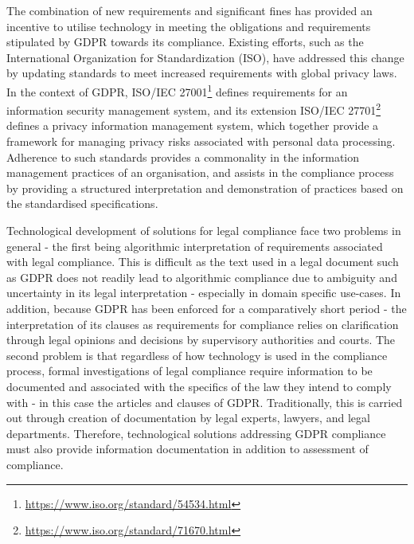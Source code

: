The combination of new requirements and significant fines has provided an incentive to utilise technology in meeting the obligations and requirements stipulated by GDPR towards its compliance.
Existing efforts, such as the International Organization for Standardization (ISO), have addressed this change by updating standards to meet increased requirements with global privacy laws.
In the context of GDPR, ISO/IEC 27001\footnote{\url{https://www.iso.org/standard/54534.html}} defines requirements for an information security management system, and its extension ISO/IEC 27701\footnote{\url{https://www.iso.org/standard/71670.html}} defines a privacy information management system, which together provide a framework for managing privacy risks associated with personal data processing.
Adherence to such standards provides a commonality in the information management practices of an organisation, and assists in the compliance process by providing a structured interpretation and demonstration of practices based on the standardised specifications.

Technological development of solutions for legal compliance face two problems in general - the first being algorithmic interpretation of requirements associated with legal compliance. This is difficult as the text used in a legal document such as GDPR does not readily lead to algorithmic compliance due to ambiguity and uncertainty in its legal interpretation - especially in domain specific use-cases.
In addition, because GDPR has been enforced for a comparatively short period - the interpretation of its clauses as requirements for compliance relies on clarification through legal opinions and decisions by supervisory authorities and courts.
The second problem is that regardless of how technology is used in the compliance process, formal investigations of legal compliance require information to be documented and associated with the specifics of the law they intend to comply with - in this case the articles and clauses of GDPR.
Traditionally, this is carried out through creation of documentation by legal experts, lawyers, and legal departments.
Therefore, technological solutions addressing GDPR compliance must also provide information documentation in addition to assessment of compliance. 


